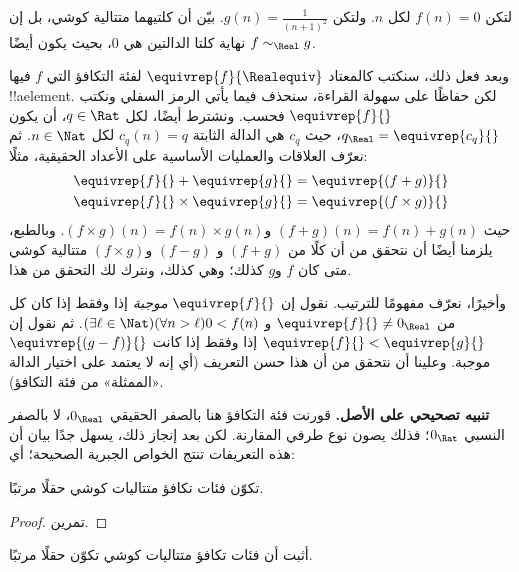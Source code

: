 \documentclass[../../../include/open-logic-section]{subfiles}
\begin{document}
\begin{prob}
لتكن $f(n) = 0$ لكل $n$. ولتكن $g(n) = \frac{1}{(n+1)^2}$. بيّن أن
كلتيهما متتالية كوشي، بل إن نهاية كلتا الدالتين هي $0$، بحيث يكون أيضًا
$f \sim_\Real g$.
\end{prob}

وبعد فعل ذلك، سنكتب كالمعتاد $\equivrep{f}{\Realequiv}$ لفئة التكافؤ
التي $f$ فيها !!a{element}. لكن حفاظًا على سهولة القراءة، سنحذف
فيما يأتي الرمز السفلي ونكتب $\equivrep{f}{}$ فحسب. ونشترط أيضًا، لكل
$q \in \Rat$، أن يكون $q_{\Real} = \equivrep{c_{q}}{}$، حيث $c_{q}$
هي الدالة الثابتة $c_q(n) = q$ لكل $n \in \Nat$. ثم نعرّف العلاقات
والعمليات الأساسية على الأعداد الحقيقية، مثلًا:
\begin{align*}
	\equivrep{f}{} + \equivrep{g}{} &= 	\equivrep{(f + g)}{} \\
	\equivrep{f}{} \times 	\equivrep{g}{} &= \equivrep{(f \times g)}{} 
\end{align*}
حيث $(f + g)(n) = f(n) + g(n)$ و$(f \times g)(n) = f(n) \times
g(n)$. وبالطبع، يلزمنا أيضًا أن نتحقق من أن كلًا من $(f + g)$ و
$(f-g)$ و$(f\times g)$ متتالية كوشي متى كان $f$ و$g$ كذلك؛ وهي كذلك،
ونترك لك التحقق من هذا.

وأخيرًا، نعرّف مفهومًا للترتيب. نقول إن $\equivrep{f}{}$
\emph{موجبة} إذا وفقط إذا كان كل من $\equivrep{f}{}\neq 0_\Real$ و
$(\exists \ell \in \Nat)(\forall n > \ell)0 < f(n)$. ثم نقول إن
$\equivrep{f}{} < \equivrep{g}{}$ إذا وفقط إذا كانت
$\equivrep{(g - f)}{}$ موجبة. وعلينا أن نتحقق من أن هذا حسن التعريف
(أي إنه لا يعتمد على اختيار الدالة «الممثلة» من فئة التكافؤ).

\textbf{تنبيه تصحيحي على الأصل.} قورنت فئة التكافؤ هنا بالصفر الحقيقي
$0_\Real$، لا بالصفر النسبي $0_\Rat$؛ فذلك يصون نوع طرفي المقارنة.
لكن بعد إنجاز ذلك، يسهل جدًا بيان أن هذه التعريفات تنتج الخواص الجبرية
الصحيحة؛ أي:
\begin{thm}
تكوّن فئات تكافؤ متتاليات كوشي حقلًا مرتبًا.
\end{thm}

\begin{proof}
تمرين.
\end{proof}

\begin{prob}
أثبت أن فئات تكافؤ متتاليات كوشي تكوّن حقلًا مرتبًا.
\end{prob}
\end{document}
